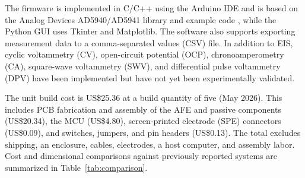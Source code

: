 The firmware is implemented in C/C++ using the Arduino IDE and is based on the Analog Devices AD5940/AD5941 library and example code \cite{ad5940_eis_github}, while the Python GUI uses Tkinter and Matplotlib. The software also supports exporting measurement data to a comma-separated values (CSV) file. In addition to EIS, cyclic voltammetry (CV), open-circuit potential (OCP), chronoamperometry (CA), square-wave voltammetry (SWV), and differential pulse voltammetry (DPV) have been implemented but have not yet been experimentally validated.

The unit build cost is US\$25.36 at a build quantity of five (May 2026). This includes PCB fabrication and assembly of the AFE and passive components (US\$20.34), the MCU (US\$4.80), screen-printed electrode (SPE) connectors (US\$0.09), and switches, jumpers, and pin headers (US\$0.13). The total excludes shipping, an enclosure, cables, electrodes, a host computer, and assembly labor. Cost and dimensional comparisons against previously reported systems are summarized in Table~\ref{tab:comparison}.